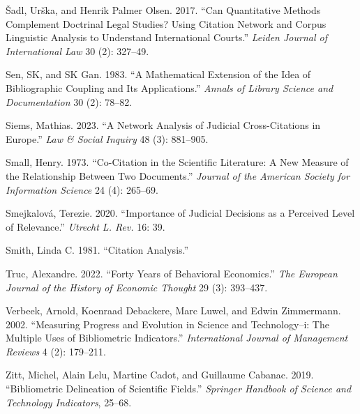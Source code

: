 \documentclass[
]{article}
\newlength{\cslhangindent}
\newlength{\cslentryspacingunit} %
\newenvironment{CSLReferences}[2] %
 {%
  \setlength{\parindent}{0pt}
  \ifodd #1
  \let\oldpar\par
  \def\par{\hangindent=\cslhangindent\oldpar}
  \fi
  \setlength{\parskip}{#2\cslentryspacingunit}
 }%
 {}
\begin{document}
\begin{CSLReferences}{1}{0}
\leavevmode{}%
Šadl, Urška, and Henrik Palmer Olsen. 2017. {``Can Quantitative Methods Complement Doctrinal Legal Studies? Using Citation Network and Corpus Linguistic Analysis to Understand International Courts.''} \emph{Leiden Journal of International Law} 30 (2): 327--49.

\leavevmode{}%
Sen, SK, and SK Gan. 1983. {``A Mathematical Extension of the Idea of Bibliographic Coupling and Its Applications.''} \emph{Annals of Library Science and Documentation} 30 (2): 78--82.

\leavevmode{}%
Siems, Mathias. 2023. {``A Network Analysis of Judicial Cross-Citations in Europe.''} \emph{Law \& Social Inquiry} 48 (3): 881--905.

\leavevmode{}%
Small, Henry. 1973. {``Co-Citation in the Scientific Literature: A New Measure of the Relationship Between Two Documents.''} \emph{Journal of the American Society for Information Science} 24 (4): 265--69.

\leavevmode{}%
Smejkalová, Terezie. 2020. {``Importance of Judicial Decisions as a Perceived Level of Relevance.''} \emph{Utrecht L. Rev.} 16: 39.

\leavevmode{}%
Smith, Linda C. 1981. {``Citation Analysis.''}

\leavevmode{}%
Truc, Alexandre. 2022. {``Forty Years of Behavioral Economics.''} \emph{The European Journal of the History of Economic Thought} 29 (3): 393--437.

\leavevmode{}%
Verbeek, Arnold, Koenraad Debackere, Marc Luwel, and Edwin Zimmermann. 2002. {``Measuring Progress and Evolution in Science and Technology--i: The Multiple Uses of Bibliometric Indicators.''} \emph{International Journal of Management Reviews} 4 (2): 179--211.

\leavevmode{}%
Zitt, Michel, Alain Lelu, Martine Cadot, and Guillaume Cabanac. 2019. {``Bibliometric Delineation of Scientific Fields.''} \emph{Springer Handbook of Science and Technology Indicators}, 25--68.

\end{CSLReferences}
\end{document}
